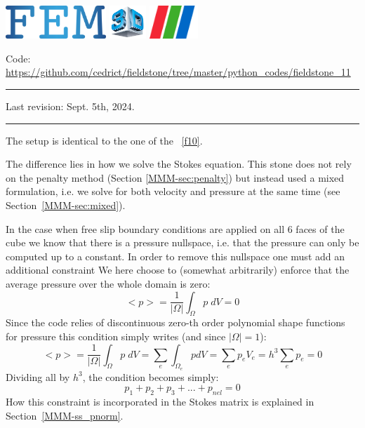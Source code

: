 \includegraphics[height=1.25cm]{images/pictograms/FEM}
\includegraphics[height=1.25cm]{images/pictograms/3d}
\includegraphics[height=1.25cm]{images/pictograms/paraview}




\begin{center}
\inpython
{\small Code: \url{https://github.com/cedrict/fieldstone/tree/master/python_codes/fieldstone_11}}
\end{center}

\par\noindent\rule{\textwidth}{0.4pt}

Last revision: Sept. 5th, 2024.

\par\noindent\rule{\textwidth}{0.4pt}


The setup is identical to the one of the \stone~\ref{f10}.

The difference lies in how we solve the Stokes equation. This stone does not rely on 
the penalty method (Section \ref{MMM-sec:penalty}) 
but instead used a mixed formulation, i.e. we solve for both 
velocity and pressure at the same time (see Section~\ref{MMM-sec:mixed}).

In the case when free slip boundary conditions are applied on all 
6 faces of the cube we know that there is a pressure nullspace, i.e.
that the pressure can only be computed up to a constant. In order to 
remove this nullspace one must add an additional constraint 
We here choose to (somewhat arbitrarily) enforce that the average pressure 
over the whole domain is zero:
\[
<p>=\frac{1}{|\Omega|} \int_\Omega p \; dV =0 
\]
Since the code relies of discontinuous zero-th order polynomial shape functions 
for pressure this condition simply writes (and since $|\Omega|=1$):
\[
<p>=\frac{1}{|\Omega|} \int_\Omega p\;  dV 
=  \sum_{e} \int_{\Omega_e} p dV = \sum_e p_e V_e = h^3 \sum_e p_e =0
\]
Dividing all by $h^3$, the condition becomes simply:
\[
p_1 + p_2 + p_3 + ... + p_{nel} = 0
\]
How this constraint is incorporated in the Stokes matrix is explained in Section~\ref{MMM-ss_pnorm}.


